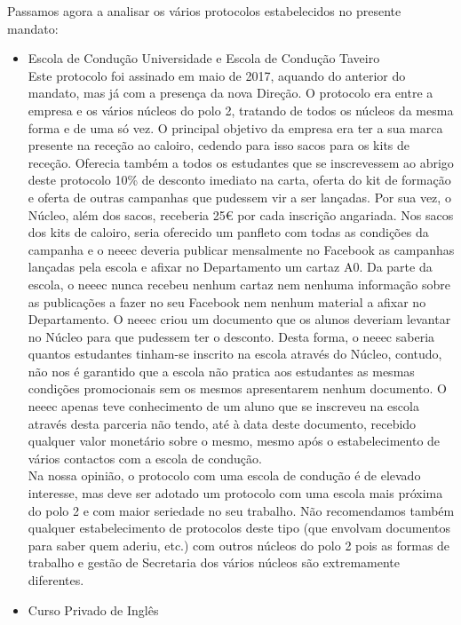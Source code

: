 Passamos agora a analisar os vários protocolos estabelecidos no presente mandato:
\begin{itemize}
\item Escola de Condução Universidade e Escola de Condução Taveiro\\
\label{parcerias_escola}
Este protocolo foi assinado em maio de 2017, aquando do anterior do mandato, mas já com a presença da nova Direção. O protocolo era entre a empresa e os vários núcleos do polo 2, tratando de todos os núcleos da mesma forma e de uma só vez. O principal objetivo da empresa era ter a sua marca presente na receção ao caloiro, cedendo para isso sacos para os kits de receção. Oferecia também a todos os estudantes que se inscrevessem ao abrigo deste protocolo 10\% de desconto imediato na carta, oferta do kit de formação e oferta de outras campanhas que pudessem vir a ser lançadas. Por sua vez, o Núcleo, além dos sacos, receberia 25€ por cada inscrição angariada. Nos sacos dos kits de caloiro, seria oferecido um panfleto com todas as condições da campanha e o \acrshort{neeec} deveria publicar mensalmente no Facebook as campanhas lançadas pela escola e afixar no Departamento um cartaz A0. Da parte da escola, o \acrshort{neeec} nunca recebeu nenhum cartaz nem nenhuma informação sobre as publicações a fazer no seu Facebook nem nenhum material a afixar no Departamento. O \acrshort{neeec} criou um documento que os alunos deveriam levantar no Núcleo para que pudessem ter o desconto. Desta forma, o \acrshort{neeec} saberia quantos estudantes tinham-se inscrito na escola através do Núcleo, contudo, não nos é garantido que a escola não pratica aos estudantes as mesmas condições promocionais sem os mesmos apresentarem nenhum documento. O \acrshort{neeec} apenas teve conhecimento de um aluno que se inscreveu na escola através desta parceria não tendo, até à data deste documento, recebido qualquer valor monetário sobre o mesmo, mesmo após o estabelecimento de vários contactos com a escola de condução.\\
Na nossa opinião, o protocolo com uma escola de condução é de elevado interesse, mas deve ser adotado um protocolo com uma escola mais próxima do polo 2 e com maior seriedade no seu trabalho. Não recomendamos também qualquer estabelecimento de protocolos deste tipo (que envolvam documentos para saber quem aderiu, etc.) com outros núcleos do polo 2 pois as formas de trabalho e gestão de Secretaria dos vários núcleos são extremamente diferentes.
\item Curso Privado de Inglês\\

\end{itemize}

